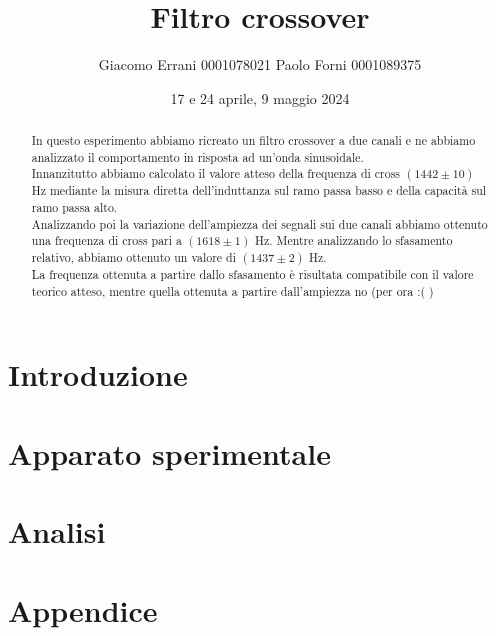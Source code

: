 \documentclass[12pt,a4paper]{article}
\title{Filtro crossover} %
\date{17 e 24 aprile, 9 maggio 2024}
\author{Giacomo Errani 0001078021 Paolo Forni 0001089375}
\newcommand{\theoryF}{ $(1442 \pm 10)$ Hz}
\newcommand{\amplitudeF}{$(1618 \pm 1)$ Hz}
\newcommand{\phaseF}{$(1437 \pm 2)$ Hz}
\begin{document}
\maketitle

\begin{abstract}

  In questo esperimento abbiamo ricreato un filtro crossover a due canali e ne abbiamo analizzato il comportamento
  in risposta ad un'onda sinusoidale. \\
  Innanzitutto abbiamo calcolato il valore atteso della frequenza di cross \theoryF \hspace{1pt} mediante la misura
  diretta dell'induttanza sul ramo passa basso e della capacità sul ramo passa alto. \\
  Analizzando poi la variazione dell'ampiezza dei segnali sui due canali abbiamo ottenuto una frequenza di cross pari a
  \amplitudeF. Mentre analizzando lo sfasamento relativo, abbiamo ottenuto un valore di \phaseF. \\
  La frequenza ottenuta a partire dallo sfasamento è risultata compatibile con il valore teorico atteso, mentre quella
  ottenuta a partire dall'ampiezza no (per ora :( )

\end{abstract}


\section{Introduzione}\label{sec:introduzione}

  


\section{Apparato sperimentale}\label{sec:apparato-sperimentale}

  


\section{Analisi}\label{sec:analisi}

  



\section*{Appendice}
  \appendix
\end{document}
